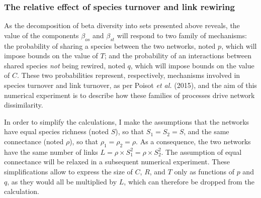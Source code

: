 \documentclass[11pt]{article}
\begin{document}
\hypertarget{the-relative-effect-of-species-turnover-and-link-rewiring}{%
\subsubsection{The relative effect of species turnover and link
rewiring}\label{the-relative-effect-of-species-turnover-and-link-rewiring}}

As the decomposition of beta diversity into sets presented above
reveals, the value of the components \(\beta_{os}\) and \(\beta_{st}\)
will respond to two family of mechanisms: the probability of sharing a
species between the two networks, noted \(p\), which will impose bounds
on the value of \(T\); and the probability of an interactions between
shared species \emph{not} being rewired, noted \(q\), which will impose
bounds on the value of \(C\). These two probabilities represent,
respectively, mechanisms involved in species turnover and link turnover,
as per Poisot \emph{et al.} (2015), and the aim of this numerical
experiment is to describe how these families of processes drive network
dissimilarity.

In order to simplify the calculations, I make the assumptions that the
networks have equal species richness (noted \(S\)), so that
\(S_1 = S_2 = S\), and the same connectance (noted \(\rho\)), so that
\(\rho_1 = \rho_2 = \rho\). As a consequence, the two networks have the
same number of links \(L = \rho\times S_1^2 = \rho\times S_2^2\). The
assumption of equal connectance will be relaxed in a subsequent
numerical experiment. These simplifications allow to express the size of
\(C\), \(R\), and \(T\) only as functions of \(p\) and \(q\), as they
would all be multiplied by \(L\), which can therefore be dropped from
the calculation.
\end{document}
